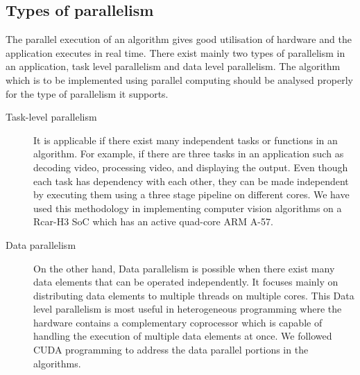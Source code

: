 \subsection{Types of parallelism}
 The parallel execution of an algorithm gives good utilisation of hardware and the application executes in real time. There exist mainly two types of parallelism in an application, task level parallelism and data level parallelism. The algorithm which is to be implemented using parallel computing should be analysed properly for the type of parallelism it supports.
\begin{description}
\item[Task-level parallelism] \hfill \break It is applicable if there exist many independent tasks or functions in an algorithm. For example, if there are three tasks in an application such as decoding video, processing video, and displaying the output. Even though each task has dependency with each other, they can be made independent by executing them using a three stage pipeline on different cores. We have used this methodology in implementing computer vision algorithms on a Rcar-H3 SoC which has an active quad-core ARM A-57.
\item [Data parallelism] \hfill \break  On the other hand, Data parallelism is possible when there exist many data elements that can be operated independently. It focuses mainly on distributing data elements to multiple threads on multiple cores. This Data level parallelism is most useful in heterogeneous programming where the hardware contains a complementary coprocessor which is capable of handling the execution of multiple data elements at once. We followed CUDA programming to address the data parallel portions in the algorithms.
\end{description}

